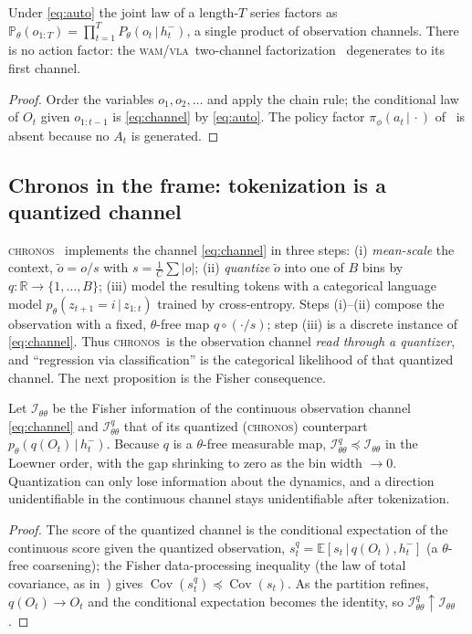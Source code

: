 \documentclass[10pt]{article}
\theoremstyle{plain}
\theoremstyle{definition}
\theoremstyle{remark}
\newcommand{\R}{\mathbb{R}}
\newcommand{\E}{\mathbb{E}}
\newcommand{\Prob}{\mathbb{P}}
\DeclareMathOperator{\Cov}{Cov}
\newcommand{\Fisher}{\mathcal{I}}
\newcommand{\Ith}{\Fisher_{\theta\theta}}
\newcommand{\given}{\,\vert\,}
\newcommand{\wm}{P_{\theta}}
\newcommand{\WAM}{\textsc{wam}}
\newcommand{\VLA}{\textsc{vla}}
\newcommand{\Chronos}{\textsc{chronos}}
\begin{document}
\begin{proposition}\label{prop:factor}
Under \eqref{eq:auto} the joint law of a length-$T$ series factors as
$\Prob_\theta(o_{1:T})=\prod_{t=1}^T \wm(o_t\given h_t^-)$, a single product of
observation channels. There is no action factor: the \WAM/\VLA\ two-channel
factorization~\cite[Prop.~2.1]{wamvla} degenerates to its first channel.
\end{proposition}
\begin{proof}
Order the variables $o_1,o_2,\dots$ and apply the chain rule; the conditional law
of $O_t$ given $o_{1:t-1}$ is \eqref{eq:channel} by \eqref{eq:auto}. The policy
factor $\pi_\phi(a_t\given\cdot)$ of~\cite{wamvla} is absent because no $A_t$ is
generated.
\end{proof}

\subsection{Chronos in the frame: tokenization is a quantized channel}
\Chronos~\cite{chronos} implements the channel \eqref{eq:channel} in three
steps: (i) \emph{mean-scale} the context, $\tilde o=o/s$ with
$s=\tfrac1C\sum|o|$; (ii) \emph{quantize} $\tilde o$ into one of $B$ bins by
$q:\R\to\{1,\dots,B\}$; (iii) model the resulting tokens with a categorical
language model $p_\theta(z_{t+1}=i\given z_{1:t})$ trained by cross-entropy.
Steps (i)--(ii) compose the observation with a fixed, $\theta$-free map $q\circ
(\cdot/s)$; step (iii) is a discrete instance of \eqref{eq:channel}. Thus
\Chronos\ is the observation channel \emph{read through a quantizer}, and
``regression via classification'' is the categorical likelihood of that
quantized channel. The next proposition is the Fisher consequence.

\begin{proposition}\label{prop:quant}
Let $\Ith$ be the Fisher information of the continuous observation channel
\eqref{eq:channel} and $\Ith^{q}$ that of its quantized (\Chronos) counterpart
$p_\theta(q(O_t)\given h_t^-)$. Because $q$ is a $\theta$-free measurable map,
$\Ith^{q}\preceq\Ith$ in the Loewner order, with the gap shrinking to zero as
the bin width $\to0$. Quantization can only lose information about the dynamics,
and a direction unidentifiable in the continuous channel stays unidentifiable
after tokenization.
\end{proposition}
\begin{proof}
The score of the quantized channel is the conditional expectation of the
continuous score given the quantized observation, $s^q_t=\E[s_t\given q(O_t),
h_t^-]$ (a $\theta$-free coarsening); the Fisher data-processing inequality
(the law of total covariance, as in~\cite[Cor.~3.4]{wamvla}) gives
$\Cov(s^q_t)\preceq\Cov(s_t)$. As the partition refines, $q(O_t)\to O_t$ and the
conditional expectation becomes the identity, so $\Ith^q\uparrow\Ith$.
\end{proof}
\end{document}
